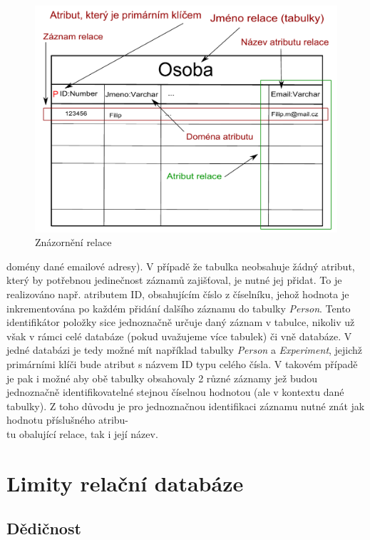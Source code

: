 \documentclass{projekt}
\begin{document}
\begin{figure}[htb]
\begin{center}
\includegraphics[scale=0.7]{relace.pdf}
\caption{Znázornění relace}
\end{center}
\end{figure}

domény dané emailové adresy). V případě že tabulka neobsahuje žádný atribut, který by potřebnou jedinečnost záznamů zajišťoval, je nutné jej přidat. To je realizováno např. atributem ID, obsahujícím číslo z číselníku, jehož hodnota je inkrementována po každém přidání dalšího záznamu do tabulky {\it Person}. Tento identifikátor položky sice jednoznačně určuje daný záznam v tabulce, nikoliv už však v rámci celé databáze (pokud uvažujeme více tabulek) či vně databáze. V jedné databázi je tedy možné mít například tabulky {\it Person} a {\it Experiment}, jejichž primárními klíči bude atribut s názvem ID typu celého čísla. V takovém případě je pak i možné aby obě tabulky obsahovaly 2 různé záznamy jež budou jednoznačně identifikovatelné stejnou číselnou hodnotou (ale v kontextu dané tabulky). Z toho důvodu je pro jednoznačnou identifikaci záznamu nutné znát jak hodnotu příslušného atribu-\\tu obalující relace, tak i její název. 


\section{Limity relační databáze}

\subsection{Dědičnost}
\end{document}
